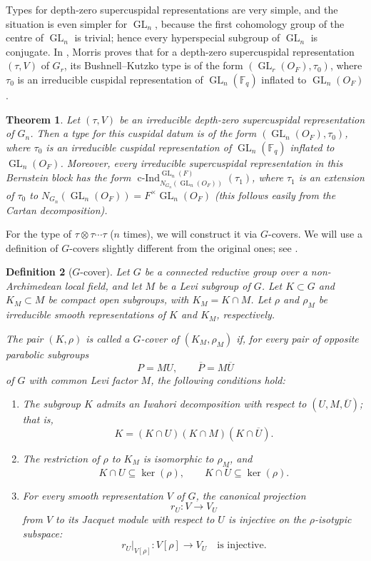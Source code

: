\documentclass[12pt]{article}
\newtheorem{theorem}{Theorem}[section]
\newtheorem{definition}[theorem]{Definition}
\theoremstyle{remark}
\begin{document}
Types for depth-zero supercuspidal representations are very simple, and the situation is even simpler for $\operatorname{GL}_n$, because the first cohomology group of the centre of $\operatorname{GL}_n$ is trivial; hence every hyperspecial subgroup of $\operatorname{GL}_n$ is conjugate. In \cite{Morris1999}, Morris proves that for a depth-zero supercuspidal representation $(\tau,V)$ of $G_r$, its Bushnell--Kutzko type is of the form $(\operatorname{GL}_r(O_F),\tau_0)$, where $\tau_0$ is an irreducible cuspidal representation of $\operatorname{GL}_n(\mathbb{F}_q)$ inflated to $\operatorname{GL}_n(O_F)$.
\begin{theorem}
Let $(\tau,V)$ be an irreducible depth-zero supercuspidal representation of $G_n$. Then a type for this cuspidal datum is of the form $(\operatorname{GL}_n(O_F),\tau_0)$, where $\tau_0$ is an irreducible cuspidal representation of $\operatorname{GL}_n(\mathbb{F}_q)$ inflated to $\operatorname{GL}_n(O_F)$. Moreover, every irreducible supercuspidal representation in this Bernstein block has the form $\operatorname{c-Ind}_{N_{G_n}(\operatorname{GL}_n(O_F))}^{\operatorname{GL}_n(F)}(\tau_1)$, where $\tau_1$ is an extension of $\tau_0$ to $N_{G_n}(\operatorname{GL}_n(O_F)) = F^{\times} \operatorname{GL}_n(O_F)$ (this follows easily from the Cartan decomposition).
\end{theorem}

For the type of $\tau \otimes \tau \cdots \tau$ ($n$ times), we will construct it via $G$-covers.
We will use a definition of $G$-covers slightly different from the original ones; see \cite[4.2]{KimYu2017}.

\begin{definition}[$G$-cover]
Let $G$ be a connected reductive group over a non-Archimedean local field, and let $M$ be a Levi subgroup of $G$. Let $K \subset G$ and $K_M \subset M$ be compact open subgroups, with $K_M = K\cap M$. Let $\rho$ and $\rho_M$ be irreducible smooth representations of $K$ and $K_M$, respectively.

The pair $(K,\rho)$ is called a \emph{$G$-cover} of $(K_M,\rho_M)$ if, for every pair of opposite parabolic subgroups
$$
P = MU,\qquad \overline{P} = M\overline{U}
$$
of $G$ with common Levi factor $M$, the following conditions hold:
\begin{enumerate}
\item The subgroup $K$ admits an Iwahori decomposition with respect to $(U,M,\overline{U})$; that is,
$$
K = (K\cap U)(K\cap M)(K\cap\overline{U}).
$$

\item The restriction of $\rho$ to $K_M$ is isomorphic to $\rho_M$, and
$$
K\cap U \subseteq \ker(\rho),\qquad K\cap\overline{U} \subseteq \ker(\rho).
$$

\item For every smooth representation $V$ of $G$, the canonical projection
$$
r_U\colon V \longrightarrow V_U
$$
from $V$ to its Jacquet module with respect to $U$ is injective on the $\rho$-isotypic subspace:
$$
\left.r_U\right|_{V[\rho]} \colon V[\rho] \longrightarrow V_U \quad\text{is injective}.
$$
\end{enumerate}
\end{definition}
\end{document}
